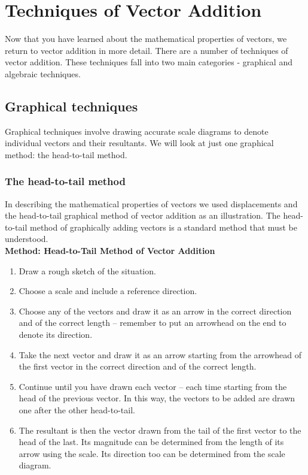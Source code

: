\section{Techniques of Vector Addition}

Now that you have learned about the mathematical properties of
vectors, we return to vector addition in more detail. There are a number of
techniques of vector addition. These techniques fall into two main categories - graphical and algebraic techniques.

\subsection*{Graphical techniques}
Graphical techniques involve drawing accurate scale diagrams to denote
individual vectors and their resultants. We will look at just one graphical method: the head-to-tail method.

\subsubsection*{The head-to-tail method}
In describing the mathematical properties of vectors we used
displacements and the head-to-tail graphical method of vector addition
as an illustration. The head-to-tail method of graphically adding vectors is a standard method that must be understood.\\

\textbf{Method: Head-to-Tail Method of Vector Addition}
\begin{enumerate}[noitemsep, label=\textbf{\arabic*}.]
\item{Draw a rough sketch of the situation.}
\item{Choose a scale and include a reference direction.}
\item{Choose any of the vectors and draw it as an arrow in the
correct direction and of the correct length -- remember to put an
arrowhead on the end to denote its direction.}
\item{Take the next vector and draw it as an arrow starting from the
arrowhead of the first vector in the correct direction and of the
correct length.}
\item{Continue until you have drawn each vector -- each time starting
from the head of the previous vector. In this way, the vectors to be
added are drawn one after the other head-to-tail.}
\item{The resultant is then the vector drawn from the tail of the
first vector to the head of the last. Its magnitude can be
determined from the length of its arrow using the scale. Its
direction too can be determined from the scale diagram.}
\end{enumerate}

